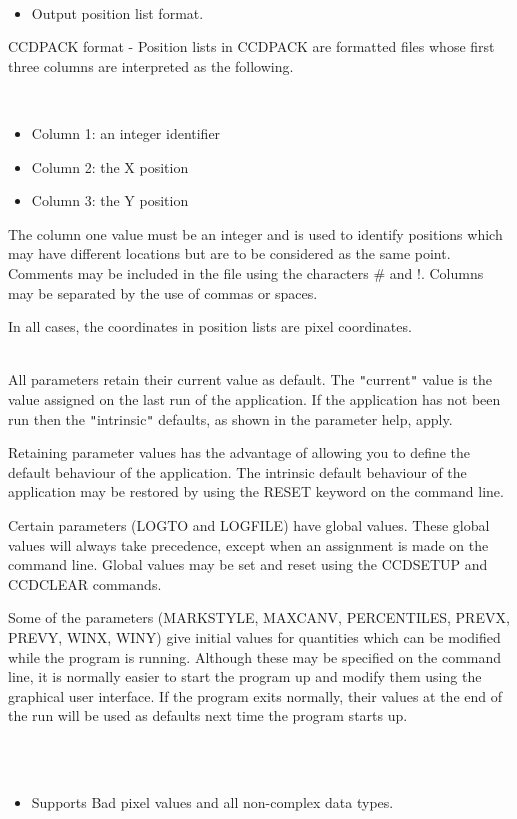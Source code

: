 \documentclass[twoside,11pt]{article}
\newcommand{\htmlref}[2]{#1}
\renewcommand{\_}{\texttt{\symbol{95}}}
\newcommand{\qt}[1]{{\tt "}#1{\tt "}}
\newcommand{\xroutine}[1]{\htmlref{{\sc #1}}{#1}}
\newcommand{\sstdiytopic}[2]{\item[#1:] \mbox{} \\[1.3ex] #2}
\newcommand{\sstimplementationstatus}[1]{
   \item[{Implementation Status:}] \mbox{} \\[1.3ex] #1}
\newcommand{\sstitemlist}[1]{
  \mbox{} \\
  \vspace{-3.5ex}
  \begin{itemize}
     #1
  \end{itemize}
}
\newcommand{\sstitem}{\item}
\newcommand{\sstdiytopic}[2]{\item[{#1}] #2 }
\newcommand{\sstimplementationstatus}[1]{
      \item[Implementation Status:] #1
   }
\newcommand{\sstitemlist}[1]{
      \begin{itemize}
         #1
      \end{itemize}
      \\
   }
\newcommand{\sstitem}{\item}
\begin{document}
{{      \sstitemlist{

         \sstitem
         Output position list format.

      }
        CCDPACK format - Position lists in CCDPACK are formatted files
        whose first three columns are interpreted as the following.

      \sstitemlist{

         \sstitem
              Column 1: an integer identifier

         \sstitem
              Column 2: the X position

         \sstitem
              Column 3: the Y position

      }
        The column one value must be an integer and is used to identify
        positions which may have different locations but are to be
        considered as the same point. Comments may be included in the
        file using the characters \# and !. Columns may be separated by
        the use of commas or spaces.

        In all cases, the coordinates in position lists are pixel
        coordinates.
   }
   \sstdiytopic{
      Behaviour of parameters
   } {
      All parameters retain their current value as default. The
      \qt{current} value is the value assigned on the last run of the
      application. If the application has not been run then the
      \qt{intrinsic} defaults, as shown in the parameter help, apply.

      Retaining parameter values has the advantage of allowing you to
      define the default behaviour of the application.  The intrinsic
      default behaviour of the application may be restored by using the
      RESET keyword on the command line.

      Certain parameters (LOGTO and LOGFILE) have global values. These
      global values will always take precedence, except when an
      assignment is made on the command line.  Global values may be set
      and reset using the \xroutine{CCDSETUP} and \xroutine{CCDCLEAR} commands.

      Some of the parameters (MARKSTYLE, MAXCANV, PERCENTILES, PREVX, PREVY, 
      WINX, WINY)  give initial values for quantities which can be modified 
      while the program is running.  Although these may be specified on
      the command line, it is normally easier to start the program up and
      modify them using the graphical user interface.  If the program
      exits normally, their values at the end of the run will be used
      as defaults next time the program starts up.
   }
   \sstimplementationstatus{
      \sstitemlist{

         \sstitem
         Supports Bad pixel values and all non-complex data types.
      }
   }
}
\end{document}
